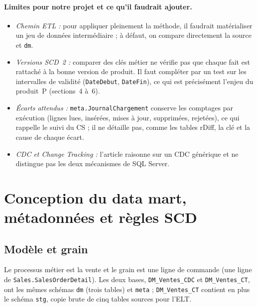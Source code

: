 \documentclass[9pt,a4paper]{article}
\begin{document}
\paragraph{Limites pour notre projet et ce qu'il faudrait ajouter.}
\begin{itemize}
  \item \emph{Chemin ETL :} pour appliquer pleinement la méthode, il faudrait matérialiser un jeu de données intermédiaire ; à défaut, on compare directement la source et \texttt{dm}.
  \item \emph{Versions SCD~2 :} comparer des clés métier ne vérifie pas que chaque fait est rattaché à la bonne version de produit. Il faut compléter par un test sur les intervalles de validité (\texttt{DateDebut}, \texttt{DateFin}), ce qui est précisément l'enjeu du produit~P (sections~4 à~6).
  \item \emph{Écarts attendus :} \texttt{meta.JournalChargement} conserve les comptages par exécution (lignes lues, insérées, mises à jour, supprimées, rejetées), ce qui rappelle le suivi du CS ; il ne détaille pas, comme les tables rDiff, la clé et la cause de chaque écart.
  \item \emph{CDC et Change Tracking :} l'article raisonne sur un CDC générique et ne distingue pas les deux mécanismes de SQL Server.
\end{itemize}

\section{Conception du data mart, métadonnées et règles SCD}

\subsection{Modèle et grain}

Le processus métier est la vente et le grain est une ligne de commande (une ligne de \texttt{Sales.SalesOrderDetail}). Les deux bases, \texttt{DM\_Ventes\_CDC} et \texttt{DM\_Ventes\_CT}, ont les mêmes schémas \texttt{dm} (trois tables) et \texttt{meta} ; \texttt{DM\_Ventes\_CT} contient en plus le schéma \texttt{stg}, copie brute de cinq tables sources pour l'ELT.
\end{document}
